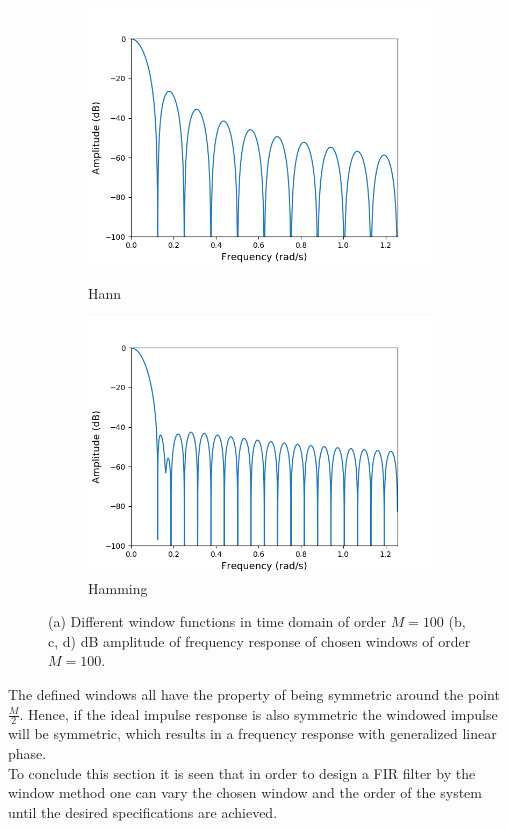 \begin{figure}[H]
\begin{subfigure}{0.49\textwidth}
\includegraphics[width=\textwidth]{figures/dbplots/bartlett.png}
\caption{Hann}
\label{fig:hann_db}
\includegraphics[width=\textwidth]{figures/dbplots/hamming.png}
\caption{Hamming}
\label{fig:hamming_db}
\end{subfigure}
\caption{(a) Different window functions in time domain of order $M=100$ (b, c, d) dB amplitude of frequency response of chosen windows of order $M=100$.}
\label{fig:windows}
\end{figure}

The defined windows all have the property of being symmetric around the point $\frac{M}{2}$. Hence, if the ideal impulse response is also symmetric the windowed impulse will be symmetric, which results in a frequency response with generalized linear phase. \\
To conclude this section it is seen that in order to design a FIR filter by the window method one can vary the chosen window and the order of the system until the desired specifications are achieved.

